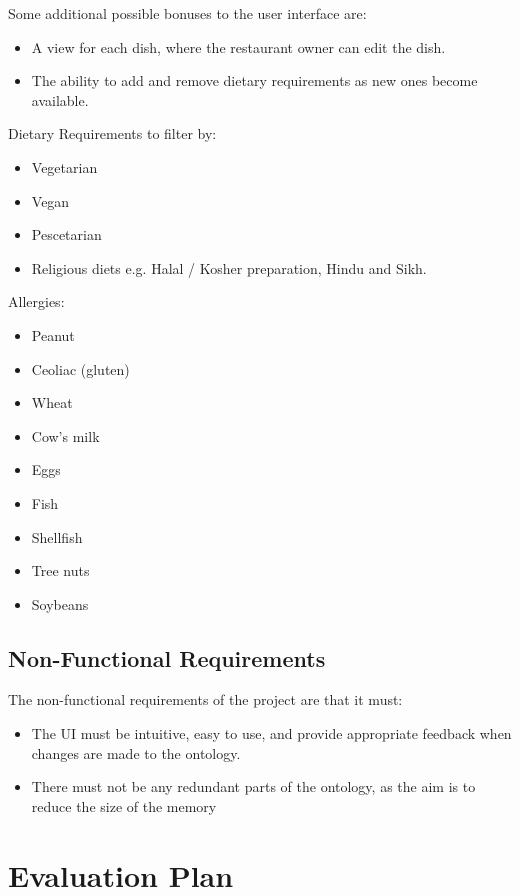 Some additional possible bonuses to the user interface are:

\begin{itemize}
\item A view for each dish, where the restaurant owner can edit the dish.
\item The ability to add and remove dietary requirements as new ones become available.
\end{itemize}

Dietary Requirements to filter by:

\begin{itemize}
\item Vegetarian
\item Vegan
\item Pescetarian
\item Religious diets e.g. Halal / Kosher preparation, Hindu and Sikh.
\end{itemize}

Allergies\cite{burks2001food}:

\begin{itemize}
\item Peanut
\item Ceoliac (gluten)
\item Wheat
\item Cow's milk
\item Eggs
\item Fish
\item Shellfish
\item Tree nuts
\item Soybeans
\end{itemize}

\subsection{Non-Functional Requirements}

The non-functional requirements of the project are that it must:

\begin{itemize}
\item The UI must be intuitive, easy to use, and provide appropriate feedback when changes are made to the ontology.
\item There must not be any redundant parts of the ontology, as the aim is to reduce the size of the memory
\end{itemize}

\section{Evaluation Plan}

